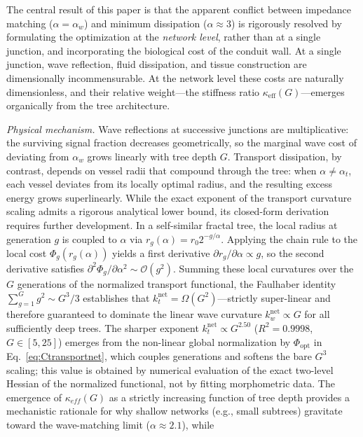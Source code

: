 \documentclass[11pt,a4paper]{article}
\theoremstyle{remark}
\begin{document}
\medskip
The central result of this paper is that the apparent conflict between impedance
matching ($\alpha = \alpha_w$) and minimum dissipation ($\alpha \approx 3$) is
rigorously resolved by formulating the optimization at the \emph{network level},
rather than at a single junction, and incorporating the biological cost of the
conduit wall.
At a single junction, wave reflection, fluid dissipation, and tissue
construction are dimensionally incommensurable.
At the network level these costs are naturally dimensionless, and their relative
weight---the stiffness ratio $\kappa_\mathrm{eff}(G)$---emerges organically from
the tree architecture.

\textit{Physical mechanism.}\quad
Wave reflections at successive junctions are multiplicative: the surviving
signal fraction decreases geometrically, so the marginal wave cost of deviating
from $\alpha_w$ grows linearly with tree depth $G$.
Transport dissipation, by contrast, depends on vessel radii that compound
through the tree: when $\alpha \neq \alpha_t$, each vessel deviates from its
locally optimal radius, and the resulting excess energy grows superlinearly.
While the exact exponent of the transport curvature scaling admits a
rigorous analytical lower bound, its closed-form derivation requires
further development. In a self-similar fractal tree, the local radius
at generation $g$ is coupled to $\alpha$ via $r_g(\alpha) = r_0
2^{-g/\alpha}$. Applying the chain rule to the local cost
$\Phi_g(r_g(\alpha))$ yields a first derivative $\partial r_g/\partial
\alpha \propto g$, so the second derivative satisfies
$\partial^2\Phi_g/\partial\alpha^2 \sim \mathcal{O}(g^2)$. Summing
these local curvatures over the $G$ generations of the normalized
transport functional, the Faulhaber identity $\sum_{g=1}^G g^2 \sim
G^3/3$ establishes that $k_t^{\mathrm{net}} = \Omega(G^2)$---strictly
super-linear and therefore guaranteed to dominate the linear wave
curvature $k_w^{\mathrm{net}} \propto G$ for all sufficiently deep
trees. The sharper exponent $k_t^{\mathrm{net}} \propto G^{2.50}$
($R^2 = 0.9998$, $G \in [5, 25]$) emerges from the non-linear global
normalization by $\Phi_{\mathrm{opt}}$ in Eq.~\eqref{eq:Ctransportnet},
which couples generations and softens the bare $G^3$ scaling; this
value is obtained by numerical evaluation of the exact two-level
Hessian of the normalized functional, not by fitting morphometric data.
The emergence of $\kappa_{eff}(G)$ as a strictly increasing function of tree
depth provides a mechanistic rationale for why shallow networks (e.g., small
subtrees) gravitate toward the wave-matching limit ($\alpha \approx 2.1$), while
\end{document}

